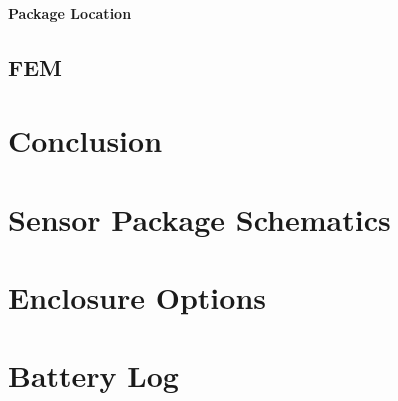 \documentclass[12pt]{report}
\begin{document}
			\subsubsection{Package Location}
				
	\section{FEM}
		
		
\chapter{Conclusion}
\label{ch:Collection}
	
	



\appendix

\chapter{Sensor Package Schematics}
\label{app:Schematic}


\chapter{Enclosure Options}
\label{app:CaseOptions}


\chapter{Battery Log}
\label{app:batterylog}

 
\end{document}
